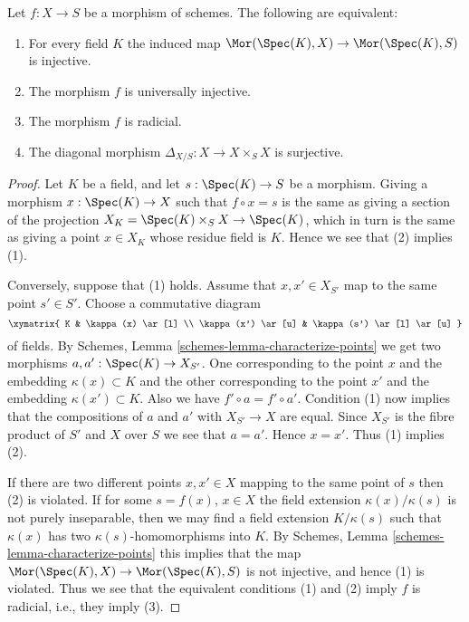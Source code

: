 \begin{lemma}
\label{lemma-universally-injective}
Let $f : X \to S$ be a morphism of schemes.
The following are equivalent:
\begin{enumerate}
\item For every field $K$ the induced map
$\Mor(\Spec(K), X) \to \Mor(\Spec(K), S)$
is injective.
\item The morphism $f$ is universally injective.
\item The morphism $f$ is radicial.
\item The diagonal morphism $\Delta_{X/S} : X \longrightarrow X \times_S X$
is surjective.
\end{enumerate}
\end{lemma}

\begin{proof}
Let $K$ be a field, and let $s : \Spec(K) \to S$ be a morphism.
Giving a morphism $x : \Spec(K) \to X$ such that $f \circ x = s$
is the same as giving a section of the projection
$X_K = \Spec(K) \times_S X \to \Spec(K)$, which in turn
is the same as giving a point $x \in X_K$ whose residue field is $K$.
Hence we see that (2) implies (1).

\medskip\noindent
Conversely, suppose that (1) holds. Assume that $x, x' \in X_{S'}$
map to the same point $s' \in S'$. Choose a commutative diagram
$$
\xymatrix{
K & \kappa(x) \ar[l] \\
\kappa(x') \ar[u] & \kappa(s') \ar[l] \ar[u]
}
$$
of fields. By Schemes, Lemma \ref{schemes-lemma-characterize-points}
we get two morphisms $a, a' : \Spec(K) \to X_{S'}$. One corresponding
to the point $x$ and the embedding $\kappa(x) \subset K$ and
the other corresponding to the  point $x'$ and the embedding
$\kappa(x') \subset K$. Also we have $f' \circ a = f' \circ a'$.
Condition (1) now implies that the compositions of $a$ and $a'$ with
$X_{S'} \to X$ are equal. Since $X_{S'}$ is the fibre product
of $S'$ and $X$ over $S$ we see that $a = a'$. Hence $x = x'$.
Thus (1) implies (2).

\medskip\noindent
If there are two different points $x, x' \in X$ mapping to the same point of $s$
then (2) is violated.
If for some $s = f(x)$, $x \in X$ the field extension
$\kappa(x)/\kappa(s)$ is not purely inseparable, then
we may find a field extension $K/\kappa(s)$ such that
$\kappa(x)$ has two $\kappa(s)$-homomorphisms into $K$. By
Schemes, Lemma \ref{schemes-lemma-characterize-points} this
implies that the map
$\Mor(\Spec(K), X) \to \Mor(\Spec(K), S)$
is not injective, and hence (1) is violated.
Thus we see that the equivalent conditions (1) and (2) imply
$f$ is radicial, i.e., they imply (3).


\end{proof}
